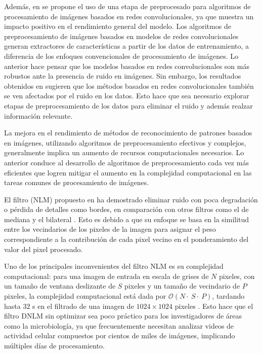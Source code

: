 Además, en \cite{CNN_DNLM} se propone el uso de una etapa de preprocesado para algoritmos de procesamiento de imágenes basados en redes convolucionales, ya que muestra un impacto positivo en el rendimiento general del modelo. Los algoritmos de preprocesamiento de imágenes basados en modelos de redes convolucionales generan extractores de características a partir de los datos de entrenamiento, a diferencia de los enfoques convencionales de procesamiento de imágenes. Lo anterior hace pensar que los modelos basados en redes convolucionales son más robustos ante la presencia de ruido en imágenes. Sin embargo, los resultados obtenidos en \cite{CNN_DNLM} sugieren que los métodos basados en redes convolucionales también se ven afectados por el ruido en los datos. Esto hace que sea necesario explorar etapas de preprocesamiento de los datos para eliminar el ruido y además realzar información relevante.

La mejora en el rendimiento de métodos de reconocimiento de patrones basados en imágenes, utilizando algoritmos de preprocesamiento efectivos y complejos, generalmente implica un aumento de recursos computacionales necesarios. Lo anterior conduce al desarrollo de algoritmos de preprocesamiento cada vez más eficientes que logren mitigar el aumento en la complejidad computacional en las tareas comunes de procesamiento de imágenes. 


El filtro  (NLM) propuesto en \cite{buades2005non} ha demostrado eliminar ruido con poca degradación o pérdida de detalles como bordes, en comparación con otros filtros como el de mediana y el bilateral \cite{CONCAPAN2016}. Esto es debido a que su enfoque se basa en la similitud entre los vecindarios de los pixeles de la imagen para asignar el peso correspondiente a la contribución de cada pixel vecino en el ponderamiento del valor del pixel procesado. 

Uno de los principales inconvenientes del filtro NLM es su complejidad computacional: para una imagen de entrada en escala de grises de $N$ pixeles, con un tamaño de ventana deslizante de $S$ pixeles y un tamaño de vecindario de $P$ pixeles, la complejidad computacional está dada por $\mathcal{O}(N\cdot~S\cdot~P)$, tardando hasta $32$ s en el filtrado de una imagen de $1024 \times 1024$ pixeles \cite{Zhu2016}. Esto hace que el filtro DNLM sin optimizar sea poco práctico para los investigadores de áreas como la microbiología, ya que frecuentemente necesitan analizar videos de actividad celular compuestos por cientos de miles de imágenes, implicando múltiples días de procesamiento. 

